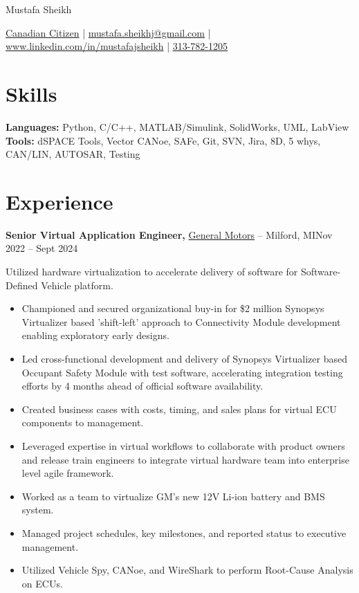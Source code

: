 \documentclass[11pt]{article}       %
\begin{document}
\centerline{\Huge Mustafa Sheikh}

\vspace{5pt}

\centerline{\href{}{Canadian Citizen} | \href{mailto:mustafa.sheikhj@gmail.com}{mustafa.sheikhj@gmail.com} | \href{wwww.linkedin.com/in/mustafajsheikh}{www.linkedin.com/in/mustafajsheikh} | \href{}{313-782-1205}}

\vspace{-10pt}

\section*{Skills}
\textbf{Languages:} Python, C/C++, MATLAB/Simulink, SolidWorks, UML, LabView \\
\textbf{Tools:} dSPACE Tools, Vector CANoe, SAFe, Git, SVN, Jira, 8D, 5 whys, CAN/LIN, AUTOSAR, Testing \\
\vspace{-6.5pt}

\section*{Experience}
\textbf{Senior Virtual Application Engineer,} \href{}{General Motors} -- Milford, MI\hfill Nov 2022 -- Sept 2024\\
\vspace{-9pt}
\begin{flushleft}
  Utilized hardware virtualization to accelerate delivery of software for Software-Defined Vehicle platform.
\end{flushleft}
\vspace{-21pt}
\begin{itemize}
  \item Championed and secured organizational buy-in for \$2 million Synopsys Virtualizer based 'shift-left' approach to Connectivity Module development enabling exploratory early designs.
  \item Led cross-functional development and delivery of Synopsys Virtualizer based Occupant Safety Module with test software, accelerating integration testing efforts by 4 months ahead of official software availability.
  \item Created business cases with costs, timing, and sales plans for virtual ECU components to management.
  \item Leveraged expertise in virtual workflows to collaborate with product owners and release train engineers to integrate virtual hardware team into enterprise level agile framework.
  \item Worked as a team to virtualize GM's new 12V Li-ion battery and BMS system. 
  \item Managed project schedules, key milestones, and reported status to executive management. 
  \item Utilized Vehicle Spy, CANoe, and WireShark to perform Root-Cause Analysis on ECUs.
\end{itemize}
\end{document}
